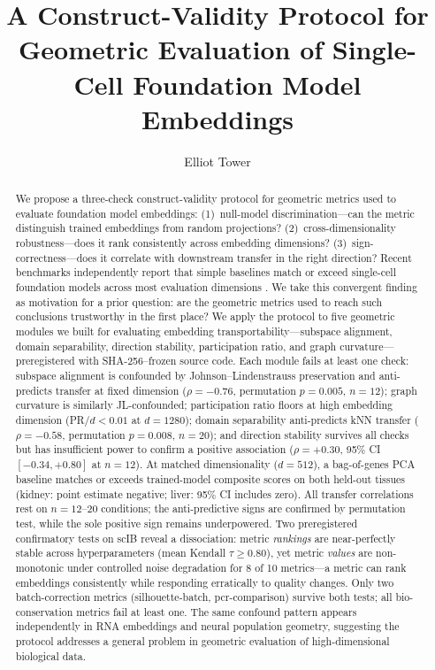 \documentclass[9pt,lineno]{elife}
\title{A Construct-Validity Protocol for Geometric Evaluation of Single-Cell Foundation Model Embeddings}
\author[1]{Elliot Tower}
\affil[1]{Independent Researcher}
\begin{document}
\maketitle

\begin{abstract}
We propose a three-check construct-validity protocol for geometric metrics used to evaluate foundation model embeddings: (1)~null-model discrimination---can the metric distinguish trained embeddings from random projections? (2)~cross-dimensionality robustness---does it rank consistently across embedding dimensions? (3)~sign-correctness---does it correlate with downstream transfer in the right direction? Recent benchmarks independently report that simple baselines match or exceed single-cell foundation models across most evaluation dimensions \citep{vcbench2026, unifiedscfm2026, cellxgeneintegration2026}. We take this convergent finding as motivation for a prior question: are the geometric metrics used to reach such conclusions trustworthy in the first place? We apply the protocol to five geometric modules we built for evaluating embedding transportability---subspace alignment, domain separability, direction stability, participation ratio, and graph curvature---preregistered with SHA-256--frozen source code. Each module fails at least one check: subspace alignment is confounded by Johnson--Lindenstrauss preservation and anti-predicts transfer at fixed dimension ($\rho = -0.76$, permutation $p = 0.005$, $n = 12$); graph curvature is similarly JL-confounded; participation ratio floors at high embedding dimension (PR$/d < 0.01$ at $d = 1280$); domain separability anti-predicts kNN transfer ($\rho = -0.58$, permutation $p = 0.008$, $n = 20$); and direction stability survives all checks but has insufficient power to confirm a positive association ($\rho = +0.30$, 95\% CI $[-0.34, +0.80]$ at $n = 12$). At matched dimensionality ($d = 512$), a bag-of-genes PCA baseline matches or exceeds trained-model composite scores on both held-out tissues (kidney: point estimate negative; liver: 95\% CI includes zero). All transfer correlations rest on $n = 12$--$20$ conditions; the anti-predictive signs are confirmed by permutation test, while the sole positive sign remains underpowered. Two preregistered confirmatory tests on scIB reveal a dissociation: metric \emph{rankings} are near-perfectly stable across hyperparameters (mean Kendall $\tau \geq 0.80$), yet metric \emph{values} are non-monotonic under controlled noise degradation for 8 of 10 metrics---a metric can rank embeddings consistently while responding erratically to quality changes. Only two batch-correction metrics (silhouette-batch, pcr-comparison) survive both tests; all bio-conservation metrics fail at least one. The same confound pattern appears independently in RNA embeddings and neural population geometry, suggesting the protocol addresses a general problem in geometric evaluation of high-dimensional biological data.
\end{abstract}
\end{document}
